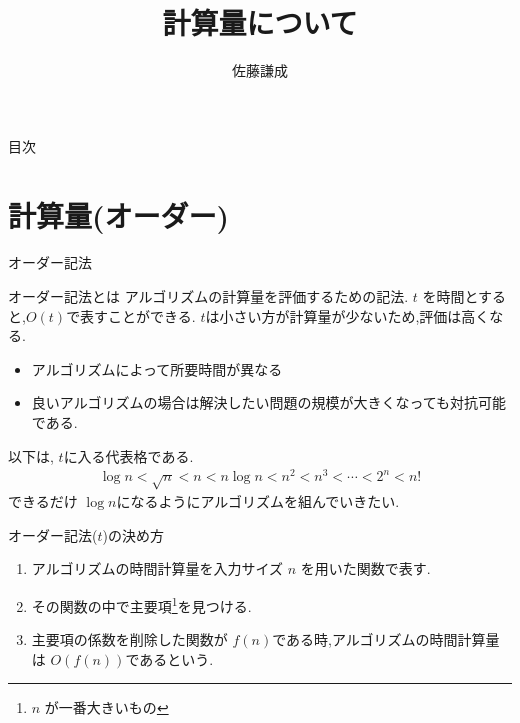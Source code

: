 

\title{計算量について}
\author{佐藤謙成}


\begin{frame}
    \titlepage
\end{frame}

\begin{frame}{目次}
    \tableofcontents[]
\end{frame}


\section{計算量(オーダー)}
\begin{frame}{オーダー記法}
    \begin{block}{オーダー記法とは}
        アルゴリズムの計算量を評価するための記法. $t$ を時間とすると,$O(t)$で表すことができる. $t$は小さい方が計算量が少ないため,評価は高くなる.
        \begin{itemize}
            \item アルゴリズムによって所要時間が異なる
            \item 良いアルゴリズムの場合は解決したい問題の規模が大きくなっても対抗可能である.
        \end{itemize}
        
        以下は, $t$に入る代表格である.
        \begin{align*}
            \log{n} < \sqrt{n} < n < n\log{n} < n^2 < n^3 < \cdots < 2^n < n!
        \end{align*}
        できるだけ $\log{n} $になるようにアルゴリズムを組んでいきたい.
    \end{block}
    
    \begin{block}{オーダー記法($t$)の決め方}
        \begin{enumerate}
            \item アルゴリズムの時間計算量を入力サイズ $n$ を用いた関数で表す.
            \item その関数の中で主要項\footnote{$n$ が一番大きいもの}を見つける.
            \item 主要項の係数を削除した関数が $f(n)$である時,アルゴリズムの時間計算量は $O(f(n))$であるという.
        \end{enumerate}
    \end{block}
\end{frame}


